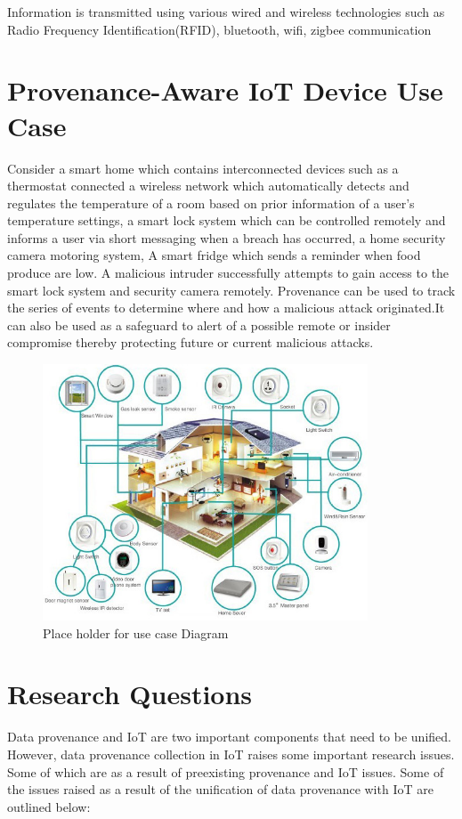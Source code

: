 Information is transmitted using various wired and wireless technologies such as Radio Frequency Identification(RFID), bluetooth, wifi, zigbee communication


\section{Provenance-Aware IoT Device Use Case}

Consider a smart home which contains interconnected devices such as a thermostat connected a wireless network which automatically detects and regulates the temperature of a room based on prior information of a user's temperature settings, a smart lock system which can be controlled remotely and informs a user via short messaging when a breach has occurred, a home security camera motoring system, A smart fridge which sends a reminder when food produce are low. A malicious intruder successfully attempts  to gain access to the smart lock system and security camera remotely. Provenance can be used to track the series  of events to determine where and how a malicious attack originated.It can also be used as a safeguard to alert of a possible remote or insider compromise thereby protecting future or current malicious attacks.

\begin{figure}[h!]
\begin{center}

\includegraphics[height=3in]{smarthome-diagram.png}
\end{center}
\caption{Place holder for use case Diagram}

\end{figure}


\section{Research Questions}
Data provenance and IoT are two important components that need to be unified. However, data provenance collection in IoT raises some important research issues. Some of which are as a result of preexisting provenance and IoT issues. Some of the issues raised as a result of the unification of data provenance with IoT are outlined below:

